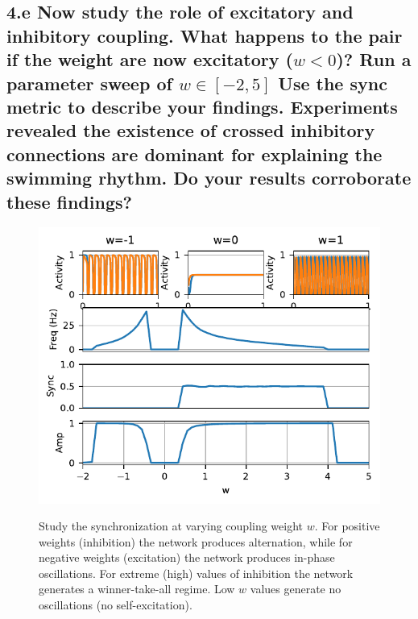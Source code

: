 \documentclass{cmc}
\begin{document}
\subsection*{4.e Now study the role of excitatory and inhibitory coupling. What happens to the pair if the weight
 are now excitatory ($w<0$)? Run a parameter sweep of $w \in [-2,5]$ Use the sync metric to describe your findings. Experiments revealed the existence of crossed inhibitory connections are dominant for explaining the swimming rhythm. Do your results corroborate these findings? }


\begin{figure}
	\centering \includegraphics[width=1\linewidth]{figures/coupled_units_-_vary_w}\\
	\caption{Study the synchronization at varying coupling weight $w$. For positive weights (inhibition) the network produces alternation, while for negative weights (excitation) the network produces in-phase oscillations. For extreme (high) values of inhibition the network generates a winner-take-all regime. Low $w$ values generate no oscillations (no self-excitation).
	\label{fig:plot_coupled_w}}
\end{figure}
\end{document}
